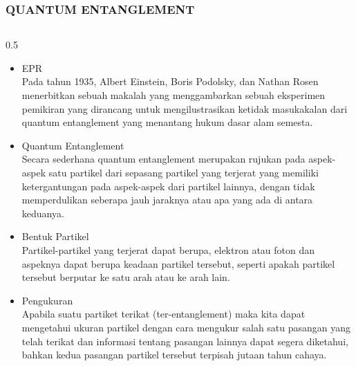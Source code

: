 \begin{frame}
\frametitle{QUANTUM ENTANGLEMENT \cite{muller2023}}
    \begin{columns} %
                \justifying %
            \tiny %
        \begin{column}{0.5\textwidth} \vspace{-0.4cm}
        \justifying %
        \small %
            \begin{itemize}\justifying \tiny
                \item EPR\\
                    Pada tahun 1935, Albert Einstein, Boris Podolsky, dan Nathan Rosen menerbitkan sebuah makalah yang menggambarkan sebuah eksperimen pemikiran yang dirancang untuk mengilustrasikan ketidak masukakalan dari quantum entanglement yang menantang hukum dasar alam semesta.
                \item Quantum Entanglement\\
                    Secara sederhana quantum entanglement merupakan rujukan pada aspek-aspek satu partikel dari sepasang partikel yang terjerat yang memiliki ketergantungan pada aspek-aspek dari partikel lainnya, dengan tidak memperdulikan seberapa jauh jaraknya atau apa yang ada di antara keduanya. 
                \item Bentuk Partikel\\
                    Partikel-partikel yang terjerat dapat berupa, elektron atau foton dan aspeknya dapat berupa keadaan partikel tersebut, seperti apakah partikel tersebut berputar ke satu arah atau ke arah lain.
                \item Pengukuran\\
                    Apabila suatu partiket terikat (ter-entanglement) maka kita dapat mengetahui ukuran partikel dengan cara mengukur salah satu pasangan yang telah terikat dan informasi tentang pasangan lainnya dapat segera diketahui, bahkan kedua pasangan partikel tersebut terpisah jutaan tahun cahaya.
            \end{itemize} 
        \end{column}
        

\end{columns}
\end{frame}
